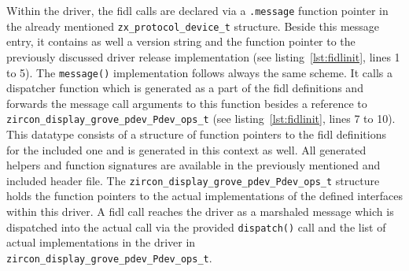 Within the driver, the \ac{fidl} calls are declared via a \texttt{.message} function pointer in the already mentioned \texttt{zx_protocol_device_t} structure.
Beside this message entry, it contains as well a version string and the function pointer to the previously discussed driver release implementation (see listing~\ref{lst:fidlinit}, lines 1 to 5).
The \texttt{message()} implementation follows always the same scheme.
It calls a dispatcher function which is generated as a part of the \ac{fidl} definitions and forwards the message call arguments to this function besides a reference to \texttt{zircon_display_grove_pdev_Pdev_ops_t} (see listing~\ref{lst:fidlinit}, lines 7 to 10).
This datatype consists of a structure of function pointers to the \ac{fidl} definitions for the included one and is generated in this context as well. 
All generated helpers and function signatures are available in the previously mentioned and included header file.
The \texttt{zircon_display_grove_pdev_Pdev_ops_t} structure holds the function pointers to the actual implementations of the defined interfaces within this driver.
A \ac{fidl} call reaches the driver as a marshaled message which is dispatched into the actual call via the provided \texttt{dispatch()} call and the list of actual implementations in the driver in \texttt{zircon_display_grove_pdev_Pdev_ops_t}.


